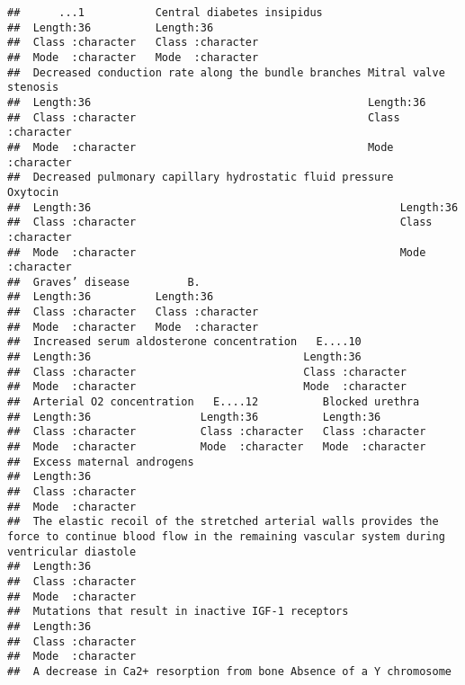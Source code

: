\documentclass[
]{article}
\begin{document}
\begin{verbatim}
##      ...1           Central diabetes insipidus
##  Length:36          Length:36                 
##  Class :character   Class :character          
##  Mode  :character   Mode  :character          
##  Decreased conduction rate along the bundle branches Mitral valve stenosis
##  Length:36                                           Length:36            
##  Class :character                                    Class :character     
##  Mode  :character                                    Mode  :character     
##  Decreased pulmonary capillary hydrostatic fluid pressure   Oxytocin        
##  Length:36                                                Length:36         
##  Class :character                                         Class :character  
##  Mode  :character                                         Mode  :character  
##  Graves’ disease         B.           
##  Length:36          Length:36         
##  Class :character   Class :character  
##  Mode  :character   Mode  :character  
##  Increased serum aldosterone concentration   E....10         
##  Length:36                                 Length:36         
##  Class :character                          Class :character  
##  Mode  :character                          Mode  :character  
##  Arterial O2 concentration   E....12          Blocked urethra   
##  Length:36                 Length:36          Length:36         
##  Class :character          Class :character   Class :character  
##  Mode  :character          Mode  :character   Mode  :character  
##  Excess maternal androgens
##  Length:36                
##  Class :character         
##  Mode  :character         
##  The elastic recoil of the stretched arterial walls provides the force to continue blood flow in the remaining vascular system during ventricular diastole
##  Length:36                                                                                                                                                
##  Class :character                                                                                                                                         
##  Mode  :character                                                                                                                                         
##  Mutations that result in inactive IGF-1 receptors
##  Length:36                                        
##  Class :character                                 
##  Mode  :character                                 
##  A decrease in Ca2+ resorption from bone Absence of a Y chromosome

\end{verbatim}
\end{document}
